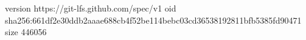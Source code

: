 version https://git-lfs.github.com/spec/v1
oid sha256:661df2e30ddb2aaae688cb4f52be114bebc03cd36538192811bfb5385fd90471
size 446056
